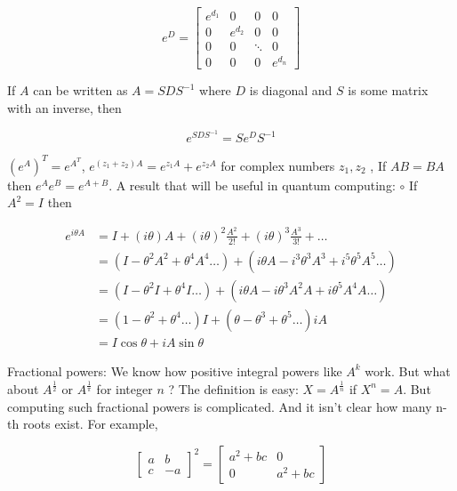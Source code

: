\documentclass[main.tex]{subfiles}
\begin{document}
    $$
    e^{D}=\left[\begin{array}{cccc}
    e^{d_{1}} & 0 & 0 & 0 \\
    0 & e^{d_{2}} & 0 & 0 \\
    0 & 0 & \ddots & 0 \\
    0 & 0 & 0 & e^{d_{n}}
    \end{array}\right]
    $$
    
    If $A$ can be written as $A=S D S^{-1}$ where $D$ is diagonal and $S$ is some matrix with an inverse, then
    
    $$
    e^{S D S^{-1}}=S e^{D} S^{-1}
    $$
    
    $\left(e^{A}\right)^{T}=e^{A^{T}}$, $e^{\left(z_{1}+z_{2}\right) A}=e^{z_{1} A}+e^{z_{2} A}$ for complex numbers $z_{1}, z_{2}$ , If $A B=B A$ then $e^{A} e^{B}=e^{A+B}$. A result that will be useful in quantum computing: $\circ$ If $A^{2}=I$ then
    
    $$
    \begin{aligned}
    e^{i \theta A} &=I+(i \theta) A+(i \theta)^{2} \frac{A^{2}}{2 !}+(i \theta)^{3} \frac{A^{3}}{3 !}+\ldots \\
    &=\left(I-\theta^{2} A^{2}+\theta^{4} A^{4} \ldots\right)+\left(i \theta A-i^{3} \theta^{3} A^{3}+i^{5} \theta^{5} A^{5} \ldots\right) \\
    &=\left(I-\theta^{2} I+\theta^{4} I \ldots\right)+\left(i \theta A-i \theta^{3} A^{2} A+i \theta^{5} A^{4} A \ldots\right) \\
    &=\left(1-\theta^{2}+\theta^{4} \ldots\right) I+\left(\theta-\theta^{3}+\theta^{5} \ldots\right) i A \\
    &=I \cos \theta+i A \sin \theta
    \end{aligned}
    $$
    
    Fractional powers: We know how positive integral powers like $A^{k}$ work. But what about $A^{\frac{1}{2}}$ or $A^{\frac{1}{\pi}}$ for integer $n$ ? The definition is easy: $X=A^{\frac{1}{n}}$ if $X^{n}=A$. But computing such fractional powers is complicated. And it isn't clear how many $\mathrm{n}$-th roots exist. For example,
    
    $$
    \left[\begin{array}{cc}
    a & b \\
    c & -a
    \end{array}\right]^{2}=\left[\begin{array}{cc}
    a^{2}+b c & 0 \\
    0 & a^{2}+b c
    \end{array}\right]
    $$
    
\end{document}
